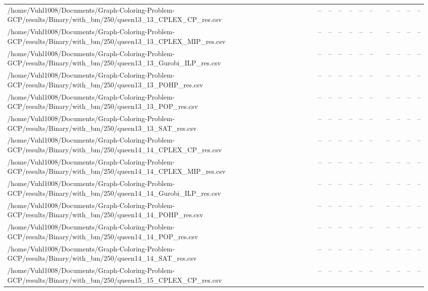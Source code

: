 \begin{table}[htbp]
\begin{tabular}{llllllllllll}
/home/Vuhl1008/Documents/Graph-Coloring-Problem-GCP/results/Binary/with\_bm/250/queen13\_13\_CPLEX\_CP\_res.csv & -- & -- & -- & -- & -- & -- & {} & -- & -- & -- & -- \\
/home/Vuhl1008/Documents/Graph-Coloring-Problem-GCP/results/Binary/with\_bm/250/queen13\_13\_CPLEX\_MIP\_res.csv & -- & -- & -- & -- & -- & -- & {} & -- & -- & -- & -- \\
/home/Vuhl1008/Documents/Graph-Coloring-Problem-GCP/results/Binary/with\_bm/250/queen13\_13\_Gurobi\_ILP\_res.csv & -- & -- & -- & -- & -- & -- & {} & -- & -- & -- & -- \\
/home/Vuhl1008/Documents/Graph-Coloring-Problem-GCP/results/Binary/with\_bm/250/queen13\_13\_POHP\_res.csv & -- & -- & -- & -- & -- & -- & {} & -- & -- & -- & -- \\
/home/Vuhl1008/Documents/Graph-Coloring-Problem-GCP/results/Binary/with\_bm/250/queen13\_13\_POP\_res.csv & -- & -- & -- & -- & -- & -- & {} & -- & -- & -- & -- \\
/home/Vuhl1008/Documents/Graph-Coloring-Problem-GCP/results/Binary/with\_bm/250/queen13\_13\_SAT\_res.csv & -- & -- & -- & -- & -- & -- & {} & -- & -- & -- & -- \\
/home/Vuhl1008/Documents/Graph-Coloring-Problem-GCP/results/Binary/with\_bm/250/queen14\_14\_CPLEX\_CP\_res.csv & -- & -- & -- & -- & -- & -- & {} & -- & -- & -- & -- \\
/home/Vuhl1008/Documents/Graph-Coloring-Problem-GCP/results/Binary/with\_bm/250/queen14\_14\_CPLEX\_MIP\_res.csv & -- & -- & -- & -- & -- & -- & {} & -- & -- & -- & -- \\
/home/Vuhl1008/Documents/Graph-Coloring-Problem-GCP/results/Binary/with\_bm/250/queen14\_14\_Gurobi\_ILP\_res.csv & -- & -- & -- & -- & -- & -- & {} & -- & -- & -- & -- \\
/home/Vuhl1008/Documents/Graph-Coloring-Problem-GCP/results/Binary/with\_bm/250/queen14\_14\_POHP\_res.csv & -- & -- & -- & -- & -- & -- & {} & -- & -- & -- & -- \\
/home/Vuhl1008/Documents/Graph-Coloring-Problem-GCP/results/Binary/with\_bm/250/queen14\_14\_POP\_res.csv & -- & -- & -- & -- & -- & -- & {} & -- & -- & -- & -- \\
/home/Vuhl1008/Documents/Graph-Coloring-Problem-GCP/results/Binary/with\_bm/250/queen14\_14\_SAT\_res.csv & -- & -- & -- & -- & -- & -- & {} & -- & -- & -- & -- \\
/home/Vuhl1008/Documents/Graph-Coloring-Problem-GCP/results/Binary/with\_bm/250/queen15\_15\_CPLEX\_CP\_res.csv & -- & -- & -- & -- & -- & -- & {} & -- & -- & -- & -- \\

\end{tabular}
\end{table}
